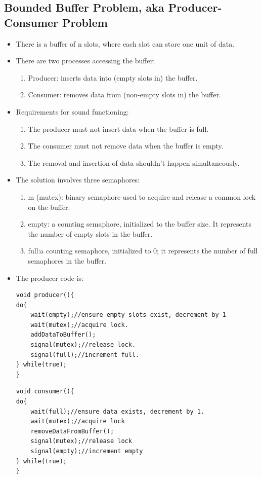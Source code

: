 \documentclass[10pt]{report}
\begin{document}
\subsection{Bounded Buffer Problem, aka Producer-Consumer Problem}
\begin{itemize}
\item There is a buffer of n slots, where each slot can store one unit of data.
\item There are two processes accessing the buffer:
\begin{enumerate}
\item Producer: inserts data into (empty slots in) the buffer.
\item Consumer: removes data from (non-empty slots in) the buffer.
\end{enumerate}
\item Requirements for sound functioning:
\begin{enumerate}
\item The producer must not insert data when the buffer is full.
\item The consumer must not remove data when the buffer is empty.
\item The removal and insertion of data shouldn't happen simultaneously.
\end{enumerate}
\item The solution involves three semaphores:
\begin{enumerate}
\item m (mutex): binary semaphore used to acquire and release a common lock on the buffer.
\item empty: a counting semaphore, initialized to the buffer size. It represents the number of empty slots in the buffer.
\item full:a counting semaphore, initialized to 0; it represents the number of full semaphores in the buffer. 
\end{enumerate}
\item The producer code is:
\begin{lstlisting}
void producer(){
do{
    wait(empty);//ensure empty slots exist, decrement by 1
    wait(mutex);//acquire lock.
    addDataToBuffer();
    signal(mutex);//release lock.
    signal(full);//increment full.
} while(true);
}
\end{lstlisting}
\begin{lstlisting}
void consumer(){
do{
    wait(full);//ensure data exists, decrement by 1.
    wait(mutex);//acquire lock
    removeDataFromBuffer();
    signal(mutex);//release lock
    signal(empty);//increment empty
} while(true);
}
\end{lstlisting}
\end{itemize}
\end{document}
